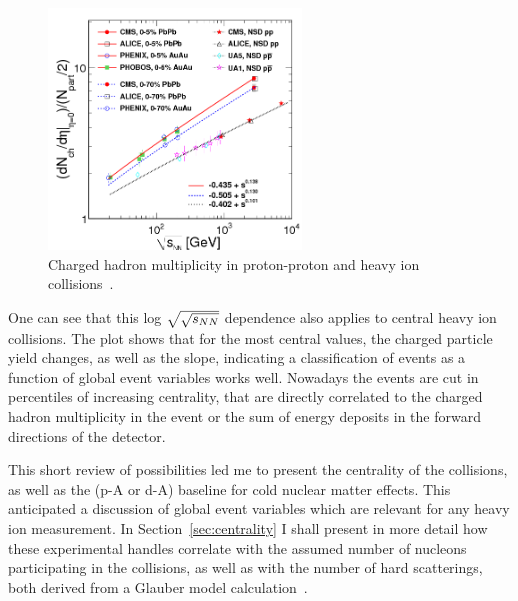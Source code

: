 \begin{figure}[h]
\begin{center}
  \includegraphics[width=0.6\textwidth]{Chapters/pQCD/multhi.png}
 \caption{Charged hadron multiplicity in proton-proton and heavy ion
   collisions~\cite{pbpbmult}.}
 \label{fig:pbpbmult}
\end{center}
\end{figure}


One
can see that this log $\sqrt{\sqrt{s_{NN}}}$ dependence also applies to central
heavy ion collisions. The plot shows that for the most central values, the charged
particle yield changes, as well as the slope, indicating a
classification of events as a function of global event variables works
well. Nowadays the events are cut in percentiles of increasing centrality,
that are directly correlated to the charged hadron multiplicity in the
event or the sum of energy deposits in the forward directions of the
detector.


This short review of possibilities led me to
present the centrality of the collisions, as well as the (p-A or d-A)
baseline for cold nuclear matter effects. This anticipated a
discussion of global event variables which are relevant for any
heavy ion measurement.
In Section~\ref{sec:centrality} I shall present in more detail how
these experimental handles correlate with the assumed number of
nucleons participating in the collisions, as well as with the number
of hard scatterings, both derived from a Glauber model calculation~\cite{Glauber:1970jm}.

